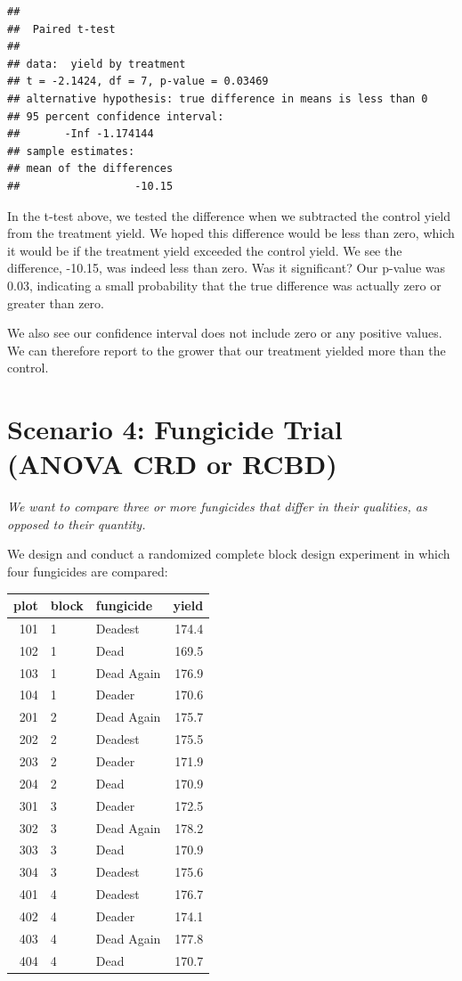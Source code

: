 \documentclass[
]{book}
\begin{document}
\begin{verbatim}
## 
##  Paired t-test
## 
## data:  yield by treatment
## t = -2.1424, df = 7, p-value = 0.03469
## alternative hypothesis: true difference in means is less than 0
## 95 percent confidence interval:
##       -Inf -1.174144
## sample estimates:
## mean of the differences 
##                  -10.15
\end{verbatim}

In the t-test above, we tested the difference when we subtracted the control yield from the treatment yield. We hoped this difference would be less than zero, which it would be if the treatment yield exceeded the control yield. We see the difference, -10.15, was indeed less than zero. Was it significant? Our p-value was 0.03, indicating a small probability that the true difference was actually zero or greater than zero.

We also see our confidence interval does not include zero or any positive values. We can therefore report to the grower that our treatment yielded more than the control.

\hypertarget{scenario-4-fungicide-trial-anova-crd-or-rcbd}{%
\section{Scenario 4: Fungicide Trial (ANOVA CRD or RCBD)}\label{scenario-4-fungicide-trial-anova-crd-or-rcbd}}

\emph{We want to compare three or more fungicides that differ in their qualities, as opposed to their quantity.}

We design and conduct a randomized complete block design experiment in which four fungicides are compared:

\begin{tabular}[t]{r|l|l|r}
\hline
plot & block & fungicide & yield\\
\hline
101 & 1 & Deadest & 174.4\\
\hline
102 & 1 & Dead & 169.5\\
\hline
103 & 1 & Dead Again & 176.9\\
\hline
104 & 1 & Deader & 170.6\\
\hline
201 & 2 & Dead Again & 175.7\\
\hline
202 & 2 & Deadest & 175.5\\
\hline
203 & 2 & Deader & 171.9\\
\hline
204 & 2 & Dead & 170.9\\
\hline
301 & 3 & Deader & 172.5\\
\hline
302 & 3 & Dead Again & 178.2\\
\hline
303 & 3 & Dead & 170.9\\
\hline
304 & 3 & Deadest & 175.6\\
\hline
401 & 4 & Deadest & 176.7\\
\hline
402 & 4 & Deader & 174.1\\
\hline
403 & 4 & Dead Again & 177.8\\
\hline
404 & 4 & Dead & 170.7\\
\hline
\end{tabular}
\end{document}
